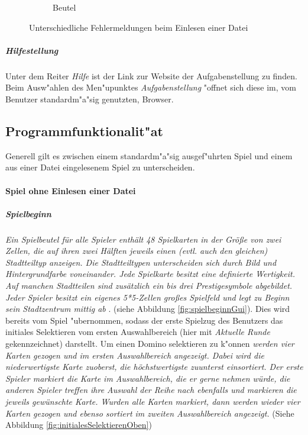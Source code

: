 \begin{figure}
\begin{subfigure}[b]{0.35\textwidth}
            \caption[]%
            {{\small Beutel}}    
            \label{fig:BeutelErr}
        \end{subfigure}
        \caption
        {\small Unterschiedliche Fehlermeldungen beim Einlesen einer Datei} 
        \label{fig:Fehleruebersicht}
    \end{figure}

\subparagraph{Hilfestellung}
Unter dem Reiter \glqq \emph{Hilfe}\grqq {} ist der Link zur Website der Aufgabenstellung zu finden. Beim Ausw"ahlen des Men"upunktes \emph{Aufgabenstellung} "offnet sich diese im, vom Benutzer standardm"a"sig genutzten, Browser. 


\subsection{Programmfunktionalit"at}
Generell gilt es zwischen einem standardm"a"sig ausgef"uhrten Spiel und einem aus einer Datei eingelesenem Spiel zu unterscheiden. 

\paragraph{Spiel ohne Einlesen einer Datei}
\subparagraph{Spielbeginn}
\emph{Ein Spielbeutel für alle Spieler enthält 48 Spielkarten in der Größe von zwei Zellen, die auf ihren zwei Hälften jeweils einen (evtl. auch den gleichen) Stadtteiltyp anzeigen. Die Stadtteiltypen unterscheiden sich durch Bild und Hintergrundfarbe voneinander. Jede Spielkarte besitzt eine definierte Wertigkeit. Auf manchen Stadtteilen sind zusätzlich ein bis drei Prestigesymbole abgebildet. Jeder Spieler besitzt ein eigenes 5*5-Zellen großes Spielfeld und legt zu Beginn sein Stadtzentrum mittig ab}
\cite{aufgabenstellung}. 
(siehe Abbildung \ref{fig:spielbeginnGui}). Dies wird bereits vom Spiel "ubernommen, sodass der erste Spielzug des Benutzers das initiales Selektieren vom ersten Auswahlbereich (hier mit \emph{Aktuelle Runde} gekennzeichnet) darstellt. Um einen Domino selektieren zu k"onnen \emph{werden vier Karten gezogen und im ersten Auswahlbereich angezeigt. Dabei wird die niederwertigste Karte zuoberst, die höchstwertigste zuunterst einsortiert. Der erste Spieler markiert die Karte im Auswahlbereich, die er gerne nehmen würde, die anderen Spieler treffen ihre Auswahl der Reihe nach ebenfalls und markieren die jeweils gewünschte Karte. Wurden alle Karten markiert, dann werden wieder vier Karten gezogen und ebenso sortiert im zweiten Auswahlbereich angezeigt.} 
\cite{aufgabenstellung}
(Siehe Abbildung \ref{fig:initialesSelektierenOben})

